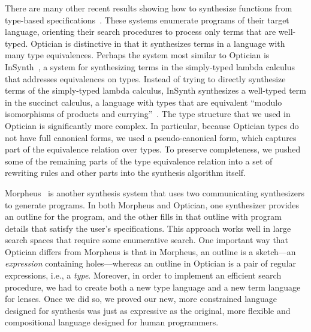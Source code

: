 \documentclass[acmsmall,review,anonymous]{acmart}
\begin{document}
There are many other recent results showing how to synthesize functions from
type-based
specifications~\cite{augustsson-2004,osera+:pldi15,feser-pldi-2015,scherer-icfp-2015,frankle+:popl16,armando+:pldi16}.
These systems enumerate programs of their target language, orienting their
search procedures to process only terms that are well-typed.
Optician is distinctive in that it synthesizes terms in a language with many
type equivalences.
Perhaps the system most similar to Optician is InSynth~\cite{gvero-pldi-2013}, a
system for synthesizing terms in the simply-typed lambda calculus that addresses
equivalences on types. Instead of trying to directly synthesize terms of the
simply-typed lambda calculus, InSynth synthesizes a well-typed term
in the succinct calculus, a language with types
that are equivalent ``modulo isomorphisms of products and
currying''~\cite{gvero-pldi-2013}. The type structure that we used in Optician
is significantly more complex.  In particular, because Optician types do not
have full canonical forms, we used a pseudo-canonical form, which captures part
of the equivalence relation over types. To preserve completeness, we pushed
some of the remaining parts of the type equivalence relation into a set of
rewriting rules and other parts into the synthesis algorithm itself.

Morpheus~\cite{morpheus} is another synthesis system that uses two
communicating synthesizers to generate programs.  In both Morpheus and
Optician, one synthesizer provides an
outline for the program, and the other fills in that outline with program
details that satisfy the user's specifications.
This approach works well in large search spaces that require some enumerative
search.
One important way that Optician differs from Morpheus is that in
Morpheus, an outline is a sketch---an
\emph{expression}
containing holes---whereas
an outline in Optician is a pair of regular
expressions, i.e., a
\emph{type}.  Moreover, in order to implement an efficient
search procedure, we had to create both a new type language and a new
term language for lenses.  Once we did so, we proved our new, more
constrained language
designed for synthesis was just as expressive as the original, more
flexible and compositional language designed for human programmers.
\end{document}
